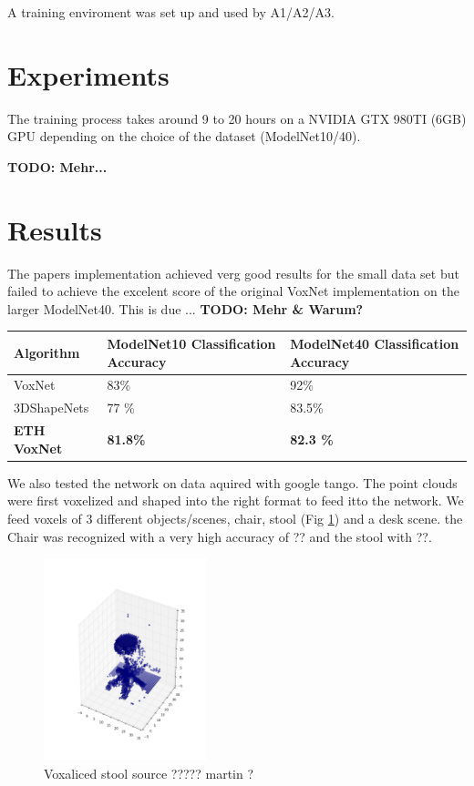 \documentclass[10pt,twocolumn,letterpaper]{article}
\begin{document}
A training enviroment was set up and used by A1/A2/A3.

\section{Experiments}

The training process takes around 9 to 20 hours on a NVIDIA GTX 980TI (6GB) GPU depending on the choice of the dataset (ModelNet10/40).

\textbf{TODO: Mehr...}

\section{Results}

The papers implementation achieved verg good results for the small data set but failed to achieve the excelent score of the 
original VoxNet implementation on the larger ModelNet40. 
This is due ... \textbf{TODO: Mehr \& Warum?} \\ 

\begin{tabular}{ |p{2.5cm}||p{2.5cm}|p{2.5cm}|  }
 \hline
 Algorithm & ModelNet10 Classification Accuracy  & ModelNet40 Classification Accuracy \\
 \hline
 VoxNet \cite{voxnet}   & 83\% & 92\% \\
 3DShapeNets  \cite{shape}   & 77 \% & 83.5\% \\
\textbf{ETH VoxNet}    & \textbf{81.8\%}   & \textbf{82.3 \%}  \\
 \hline
\end{tabular}


We also tested the network on data aquired with google tango. The point clouds were first voxelized
and shaped into the right format to feed itto the network. We feed voxels of 3 different objects/scenes, chair, 
stool (Fig \ref{fig:voxel_stool}) and a desk scene. the Chair was recognized with a very high accuracy of ?? and the stool with  ??.

\begin{figure}[h]
	\label{fig:voxel_stool}
	\centering
	\includegraphics[width=0.42\textwidth]{figures/tango_voxel_stool}
	\caption{Voxaliced stool source ????? martin ?}
\end{figure}
\end{document}

